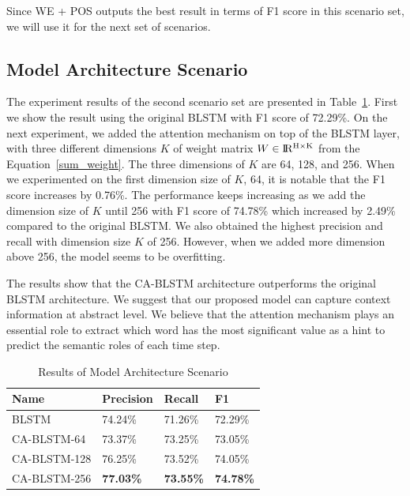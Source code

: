 Since WE + POS outputs the best result in terms of F1 score in this scenario set, we will use it for the next set of scenarios.

\subsection{Model Architecture Scenario}
The experiment results of the second scenario set are presented in Table~\ref{tab:architecture_scenario}. First we show the result using the original BLSTM with F1 score of 72.29\%. On the next experiment, we added the attention mechanism on top of the BLSTM layer, with three different dimensions $K$ of weight matrix $W \in {\rm I\!R^{H \times K}}$ from the Equation~\ref{sum_weight}. The three dimensions of $K$ are 64, 128, and 256. When we experimented on the first dimension size of $K$, 64, it is notable that the F1 score increases by 0.76\%. The performance keeps increasing as we add the dimension size of $K$ until 256 with F1 score of 74.78\% which increased by 2.49\% compared to the original BLSTM. We also obtained the highest precision and recall with dimension size $K$ of 256. However, when we added more dimension above 256, the model seems to be overfitting.

The results show that the CA-BLSTM architecture outperforms the original BLSTM architecture. We suggest that our proposed model can capture context information at abstract level. We believe that the attention mechanism plays an essential role to extract which word has the most significant value as a hint to predict the semantic roles of each time step.

\begin{table}
	\caption{Results of Model Architecture Scenario}
	\label{tab:architecture_scenario}
	\begin{tabular}{llll}
		\toprule
		Name			&Precision					&Recall		&F1			\\
		\midrule
		BLSTM				&	74.24\%				&	71.26\%				&	72.29\%	\\
		CA-BLSTM-64			&	73.37\%				&	73.25\%				&	73.05\%	\\
		CA-BLSTM-128		&	76.25\%				&	73.52\%				&	74.05\%	\\
		CA-BLSTM-256		&	\textbf{77.03\%}	&	\textbf{73.55\%}	&	\textbf{74.78\%}\\
		\bottomrule
	\end{tabular}
\end{table}


